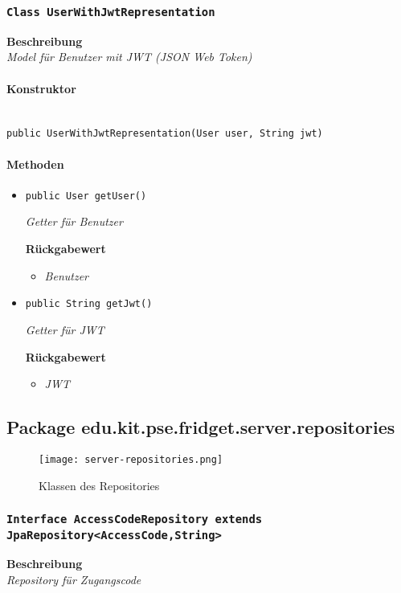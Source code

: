      \subsubsection{\texttt{Class UserWithJwtRepresentation}}
     \textbf{Beschreibung} \\
     \textit{Model für Benutzer mit JWT (JSON Web Token)}
     \paragraph*{Konstruktor}\mbox{} \\
     \texttt{public UserWithJwtRepresentation(User user, String jwt)}
     \paragraph*{Methoden}
     \begin{itemize}
     	\item{\texttt{public User getUser()}}
     	
     	\textit{Getter für Benutzer}
     	
     	\textbf{Rückgabewert}
     	\begin{itemize}
     		\item\textit{Benutzer}
     	\end{itemize}
     
     \item{\texttt{public String getJwt()}}
     	
     	\textit{Getter für JWT}
     	
     	\textbf{Rückgabewert}
     	\begin{itemize}
     		\item\textit{JWT}
     	\end{itemize}
     \end{itemize}
 \newpage
     \subsection{Package edu.kit.pse.fridget.server.repositories}
     \begin{figure}[H]
	       \centering
	       \texttt{[image: server-repositories.png]}
	       \caption{Klassen des Repositories}
	      \end{figure}
     \subsubsection{\texttt{Interface AccessCodeRepository extends JpaRepository<AccessCode,String>}}
     \textbf{Beschreibung} \\
     \textit{Repository für Zugangscode}
